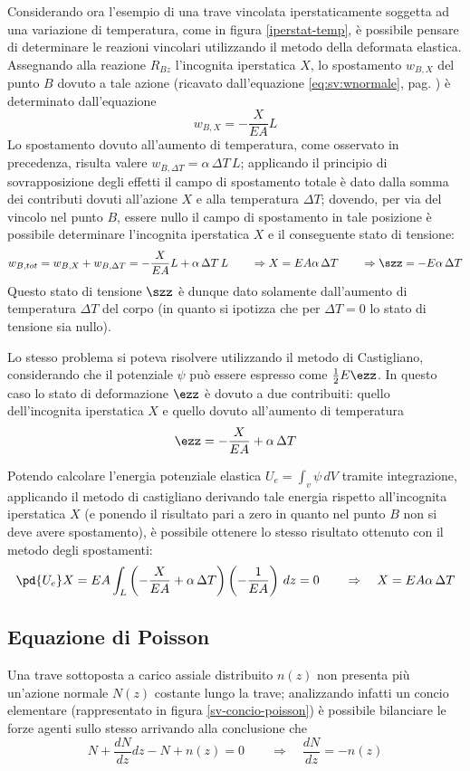 		Considerando ora l'esempio di una trave vincolata iperstaticamente soggetta ad una variazione di temperatura, come in figura \ref{iperstat-temp}, è possibile pensare di determinare le reazioni vincolari utilizzando il metodo della deformata elastica. Assegnando alla reazione $R_{Bz}$ l'incognita iperstatica $X$, lo spostamento $w_{B,X}$ del punto $B$ dovuto a tale azione (ricavato dall'equazione \ref{eq:sv:wnormale}, pag. \pageref{eq:sv:wnormale}) è determinato dall'equazione
		\[ w_{B,X} = - \frac X{EA}L \]
		Lo spostamento dovuto all'aumento di temperatura, come osservato in precedenza, risulta valere $w_{B,\Delta T} = \alpha\, \Delta T \, L$; applicando il principio di sovrapposizione degli effetti il campo di spostamento totale è dato dalla somma dei contributi dovuti all'azione $X$ e alla temperatura $\Delta T$; dovendo, per via del vincolo nel punto $B$, essere nullo il campo di spostamento in tale posizione è possibile determinare l'incognita iperstatica $X$ e il conseguente stato di tensione:
		\[  w_{B,tot} =  w_{B,X} + w_{B, \Delta T} = - \frac X{EA}L + \alpha\, \Delta T \, L \qquad \Rightarrow X = EA \alpha\, \Delta T \qquad \Rightarrow  \szz = -E\alpha\,\Delta T  \]
		Questo stato di tensione $\szz$ è dunque dato solamente dall'aumento di temperatura $\Delta T$ del corpo (in quanto si ipotizza che per $\Delta T=0$ lo stato di tensione sia nullo).
		
		\vspace{3mm}
		
		Lo stesso problema si poteva risolvere utilizzando il metodo di Castigliano, considerando che il potenziale $\psi$ può essere espresso come $\frac 1 2 E \ezz$. In questo caso lo stato di deformazione $\ezz$ è dovuto a due contribuiti: quello dell'incognita iperstatica $X$ e quello dovuto all'aumento di temperatura
		\[ \ezz = - \frac X{EA} + \alpha\, \Delta T \]
		
		Potendo calcolare l'energia potenziale elastica $U_e= \int_v\psi\, dV$ tramite integrazione, applicando il metodo di castigliano  derivando tale energia rispetto all'incognita iperstatica $X$ (e ponendo il risultato pari a zero in quanto nel punto $B$ non si deve avere spostamento), è possibile ottenere lo stesso risultato ottenuto con il metodo degli spostamenti:
		\[ \pd{U_e}X = EA \int_L \left(- \frac X {EA} + \alpha\,\Delta T\right)\left(-\frac 1 {EA}\right)\, dz = 0 \qquad \Rightarrow \quad X = EA\alpha\, \Delta T \]
	
	\subsection{Equazione di Poisson}
		Una trave sottoposta a carico assiale distribuito $n(z)$ non presenta più un'azione normale $N(z)$ costante lungo la trave; analizzando infatti un concio elementare (rappresentato in figura \ref{sv-concio-poisson}) è possibile bilanciare le forze agenti sullo stesso arrivando alla conclusione che
		\begin{equation} \label{eq:sv:temp1}
			N + \frac{dN}{dz}dz - N + n(z) = 0 \qquad \Rightarrow \quad \frac {dN} {dz} = -n(z)
		\end{equation}
		
